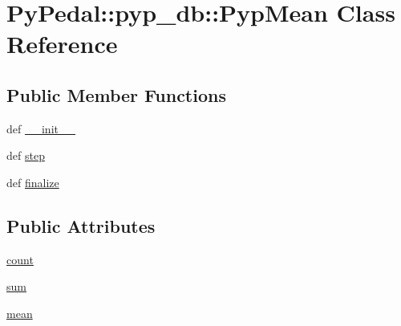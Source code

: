 \hypertarget{classPyPedal_1_1pyp__db_1_1PypMean}{
\section{PyPedal::pyp\_\-db::PypMean Class Reference}
\label{classPyPedal_1_1pyp__db_1_1PypMean}
}
\subsection*{Public Member Functions}
\begin{CompactItemize}
\item 
\hypertarget{classPyPedal_1_1pyp__db_1_1PypMean_f2588c4e48bbf86650bde315201e8e68}{
def \hyperlink{classPyPedal_1_1pyp__db_1_1PypMean_f2588c4e48bbf86650bde315201e8e68}{\_\-\_\-init\_\-\_\-}}
\label{classPyPedal_1_1pyp__db_1_1PypMean_f2588c4e48bbf86650bde315201e8e68}

\item 
\hypertarget{classPyPedal_1_1pyp__db_1_1PypMean_69a5b3ff7bb42d69e966c3220bc0b5ba}{
def \hyperlink{classPyPedal_1_1pyp__db_1_1PypMean_69a5b3ff7bb42d69e966c3220bc0b5ba}{step}}
\label{classPyPedal_1_1pyp__db_1_1PypMean_69a5b3ff7bb42d69e966c3220bc0b5ba}

\item 
\hypertarget{classPyPedal_1_1pyp__db_1_1PypMean_6d6c47cf928a7b08147e155ea5916ab4}{
def \hyperlink{classPyPedal_1_1pyp__db_1_1PypMean_6d6c47cf928a7b08147e155ea5916ab4}{finalize}}
\label{classPyPedal_1_1pyp__db_1_1PypMean_6d6c47cf928a7b08147e155ea5916ab4}

\end{CompactItemize}
\subsection*{Public Attributes}
\begin{CompactItemize}
\item 
\hypertarget{classPyPedal_1_1pyp__db_1_1PypMean_3b32d08a7bf05676e85a08d3e5cf4422}{
\hyperlink{classPyPedal_1_1pyp__db_1_1PypMean_3b32d08a7bf05676e85a08d3e5cf4422}{count}}
\label{classPyPedal_1_1pyp__db_1_1PypMean_3b32d08a7bf05676e85a08d3e5cf4422}

\item 
\hypertarget{classPyPedal_1_1pyp__db_1_1PypMean_1938e20bef70db8af9806206cc1f7778}{
\hyperlink{classPyPedal_1_1pyp__db_1_1PypMean_1938e20bef70db8af9806206cc1f7778}{sum}}
\label{classPyPedal_1_1pyp__db_1_1PypMean_1938e20bef70db8af9806206cc1f7778}

\item 
\hypertarget{classPyPedal_1_1pyp__db_1_1PypMean_bcc22f2240cae5da8791305fc13bf429}{
\hyperlink{classPyPedal_1_1pyp__db_1_1PypMean_bcc22f2240cae5da8791305fc13bf429}{mean}}
\label{classPyPedal_1_1pyp__db_1_1PypMean_bcc22f2240cae5da8791305fc13bf429}

\end{CompactItemize}


